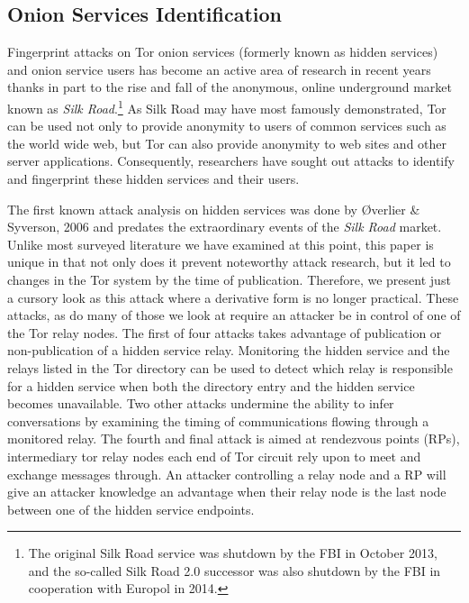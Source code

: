 \documentclass[sigconf]{acmart}
\begin{document}
\subsection{Onion Services Identification}

Fingerprint attacks on Tor onion services (formerly known as hidden
services) and onion service users has become an active area of research
in recent years thanks in part to the rise and fall of the anonymous,
online underground market known as \emph{Silk Road}.\footnote{The
original Silk Road service was shutdown by the FBI in October 2013, and
the so-called Silk Road 2.0 successor was also shutdown by the FBI in
cooperation with Europol in 2014.}  As Silk Road may have most famously
demonstrated, Tor can be used not only to provide anonymity to users of
common services such as the world wide web, but Tor can also provide
anonymity to web sites and other server applications.  Consequently,
researchers have sought out attacks to identify and fingerprint these
hidden services and their users.

The first known attack analysis on hidden services was done by
{\O}verlier \& Syverson, 2006 \cite{overlier_locating_2006} and predates
the extraordinary events of the \emph{Silk Road} market.  Unlike most
surveyed literature we have examined at this point, this paper is unique
in that not only does it prevent noteworthy attack research, but it led
to changes in the Tor system by the time of publication.  Therefore, we
present just a cursory look as this attack where a derivative form is no
longer practical.  These attacks, as do many of those we look at require
an attacker be in control of one of the Tor relay nodes.  The first of
four attacks takes advantage of publication or non-publication of a
hidden service relay.  Monitoring the hidden service and the relays
listed in the Tor directory can be used to detect which relay is
responsible for a hidden service when both the directory entry and the
hidden service becomes unavailable.  Two other attacks undermine the
ability to infer conversations by examining the timing of communications
flowing through a monitored relay.  The fourth and final attack is aimed
at rendezvous points (RPs), intermediary tor relay nodes each end of Tor
circuit rely upon to meet and exchange messages through.  An attacker
controlling a relay node and a RP will give an attacker knowledge an
advantage when their relay node is the last node between one of the
hidden service endpoints.
\end{document}
